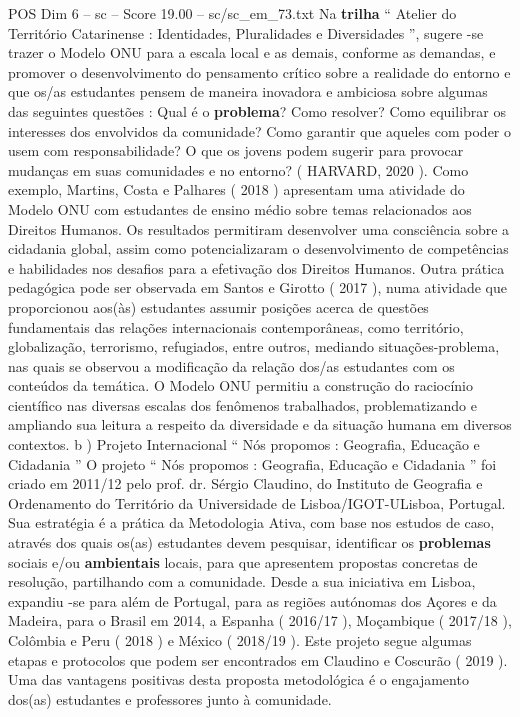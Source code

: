 \begin{textsample}{POS Dim 6 – sc – Score 19.00 – sc/sc\_em\_73.txt}
Na \textbf{trilha} “ Atelier do Território Catarinense : Identidades, Pluralidades e Diversidades ”, sugere -se trazer o Modelo ONU para a escala local e as demais, conforme as demandas, e promover o desenvolvimento do pensamento crítico sobre a realidade do entorno e que os/as estudantes pensem de maneira inovadora e ambiciosa sobre algumas das seguintes questões : Qual é o \textbf{problema}?
Como resolver?
Como equilibrar os interesses dos envolvidos da comunidade?
Como garantir que aqueles com poder o usem com responsabilidade?
O que os jovens podem sugerir para provocar mudanças em suas comunidades e no entorno? ( HARVARD, 2020 ).
Como exemplo, Martins, Costa e Palhares ( 2018 ) apresentam uma atividade do Modelo ONU com estudantes de ensino médio sobre temas relacionados aos Direitos Humanos.
Os resultados permitiram desenvolver uma consciência sobre a cidadania global, assim como potencializaram o desenvolvimento de competências e habilidades nos desafios para a efetivação dos Direitos Humanos.
Outra prática pedagógica pode ser observada em Santos e Girotto ( 2017 ), numa atividade que proporcionou aos(às) estudantes assumir posições acerca de questões fundamentais das relações internacionais contemporâneas, como território, globalização, terrorismo, refugiados, entre outros, mediando situações-problema, nas quais se observou a modificação da relação dos/as estudantes com os conteúdos da temática.
O Modelo ONU permitiu a construção do raciocínio científico nas diversas escalas dos fenômenos trabalhados, problematizando e ampliando sua leitura a respeito da diversidade e da situação humana em diversos contextos. b ) Projeto Internacional “ Nós propomos : Geografia, Educação e Cidadania ” O projeto “ Nós propomos : Geografia, Educação e Cidadania ” foi criado em 2011/12 pelo prof. dr.
Sérgio Claudino, do Instituto de Geografia e Ordenamento do Território da Universidade de Lisboa/IGOT-ULisboa, Portugal.
Sua estratégia é a prática da Metodologia Ativa, com base nos estudos de caso, através dos quais os(as) estudantes devem pesquisar, identificar os \textbf{problemas} sociais e/ou \textbf{ambientais} locais, para que apresentem propostas concretas de resolução, partilhando com a comunidade.
Desde a sua iniciativa em Lisboa, expandiu -se para além de Portugal, para as regiões autónomas dos Açores e da Madeira, para o Brasil em 2014, a Espanha ( 2016/17 ), Moçambique ( 2017/18 ), Colômbia e Peru ( 2018 ) e México ( 2018/19 ).
Este projeto segue algumas etapas e protocolos que podem ser encontrados em Claudino e Coscurão ( 2019 ).
Uma das vantagens positivas desta proposta metodológica é o engajamento dos(as) estudantes e professores junto à comunidade.

\end{textsample}
